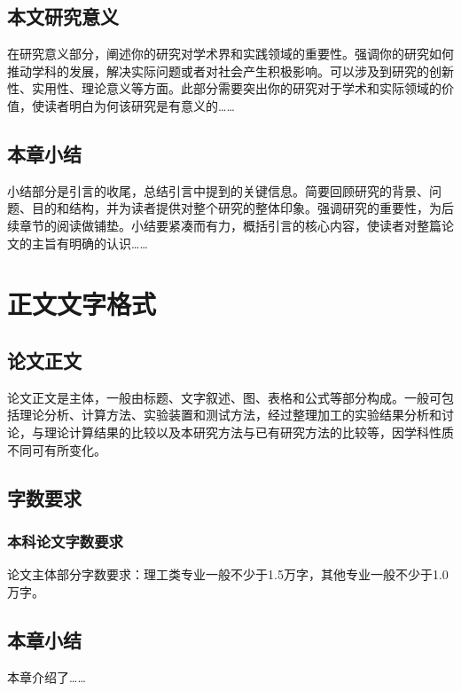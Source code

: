 \documentclass[UTF8,a4paper,12pt]{ctexart}
\numberwithin{equation}{section}
\begin{document}
\subsection{本文研究意义}
在研究意义部分，阐述你的研究对学术界和实践领域的重要性。强调你的研究如何推动学科的发展，解决实际问题或者对社会产生积极影响。可以涉及到研究的创新性、实用性、理论意义等方面。此部分需要突出你的研究对于学术和实际领域的价值，使读者明白为何该研究是有意义的……

\subsection{本章小结}
小结部分是引言的收尾，总结引言中提到的关键信息。简要回顾研究的背景、问题、目的和结构，并为读者提供对整个研究的整体印象。强调研究的重要性，为后续章节的阅读做铺垫。小结要紧凑而有力，概括引言的核心内容，使读者对整篇论文的主旨有明确的认识……

\newpage
{}

\section{正文文字格式}
\subsection{论文正文}
论文正文是主体，一般由标题、文字叙述、图、表格和公式等部分构成。一般可包括理论分析、计算方法、实验装置和测试方法，经过整理加工的实验结果分析和讨论，与理论计算结果的比较以及本研究方法与已有研究方法的比较等，因学科性质不同可有所变化。\par

\subsection{字数要求}
\subsubsection{本科论文字数要求}
论文主体部分字数要求：理工类专业一般不少于1.5万字，其他专业一般不少于1.0万字。

\subsection{本章小结}
本章介绍了……

\newpage
{}
\end{document}
